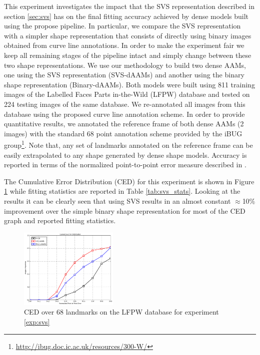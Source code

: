 This experiment investigates the impact that the SVS representation described in section \ref{sec:svs} has on the final fitting accuracy achieved by dense models built using the propose pipeline. In particular, we compare the SVS representation with a simpler shape representation that consists of directly using binary images obtained from curve line annotations. In order to make the experiment fair we keep all remaining stages of the pipeline intact and simply change between these two shape representations. We use our methodology to build two dense AAMs, one using the SVS representation (SVS-dAAMs) and another using the binary shape representation (Binary-dAAMs). Both models were built using 811 training images of the Labelled Faces Parts in-the-Wild (LFPW) \cite{Belhumeur2011} database and tested on 224 testing images of the same database. We re-annotated all images from this database using the proposed curve line annotation scheme. In order to provide quantitative results, we annotated the reference frame of both dense AAMs (2 images) with the standard 68 point annotation scheme provided by the iBUG group\footnote{\label{ibug_300} \url{http://ibug.doc.ic.ac.uk/resources/300-W/}}. Note that, any set of landmarks annotated on the reference frame can be easily extrapolated to any shape generated by dense shape models.
Accuracy is reported in terms of the normalized point-to-point error measure described in \cite{Zhu2012}.

The Cumulative Error Distribution (CED) for this experiment is shown in Figure \ref{fig:svs_ced} while fitting statistics are reported in Table \ref{tab:svs_stats}. Looking at the results it can be clearly seen that using SVS results in an almost constant $\approx$10\% improvement over the simple binary shape representation for most of the CED graph and reported fitting statistics.

\begin{figure}[t!]
\centering
\includegraphics[width=0.42\textwidth]{resources/Fig_SVS/svs_ced}
\caption{CED over 68 landmarks on the LFPW database for experiment \ref{exp:svs}}
\label{fig:svs_ced}
\end{figure}


